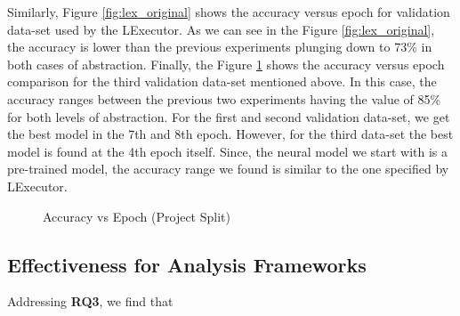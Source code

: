 Similarly, Figure \ref{fig:lex_original} shows the accuracy versus epoch for validation data-set used by the LExecutor.
As we can see in the Figure \ref{fig:lex_original}, the accuracy is lower than the previous experiments plunging down to 73\% in both cases of abstraction.
Finally, the Figure \ref{fig:lex_project} shows the accuracy versus epoch comparison for the third validation data-set mentioned above.
In this case, the accuracy ranges between the previous two experiments having the value of 85\% for both levels of abstraction.
For the first and second validation data-set, we get the best model in the 7th and 8th epoch.
However, for the third data-set the best model is found at the 4th epoch itself.
Since, the neural model we start with is a pre-trained model, the accuracy range we found is similar to the one specified by LExecutor.

\begin{figure}[ht]
    \centering
    \caption[Accuracy vs Epoch (Project Split)]{\label{fig:lex_project}Accuracy vs Epoch (Project Split) }
\end{figure}


\subsection{Effectiveness for Analysis Frameworks}
Addressing \textbf{RQ3}, we find that 